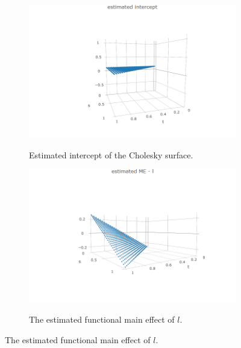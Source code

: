 \documentclass[12pt]{article}
\theoremstyle{definition}
\begin{document}
\begin{figure}[H] \label{fig:cattle-cholesky-components}
  \begin{subfigure}[t]{0.45\textwidth}
\centering
\includegraphics[width = \textwidth]{img/cattle/estimated-cholesky-surface-intercept-3d}
\label{fig:cattleA-phi-intercept}
\caption{Estimated intercept of the Cholesky surface.}
\end{subfigure}
\hfill
 \begin{subfigure}[t]{0.45\textwidth}
\centering
\includegraphics[width = \textwidth]{img/cattle/estimated-cholesky-surface-l-me-3d}
\label{fig:cattleA-l-me}
\caption{The estimated  functional main effect of $l$.}
\end{subfigure} 


\end{figure}
\end{document}
